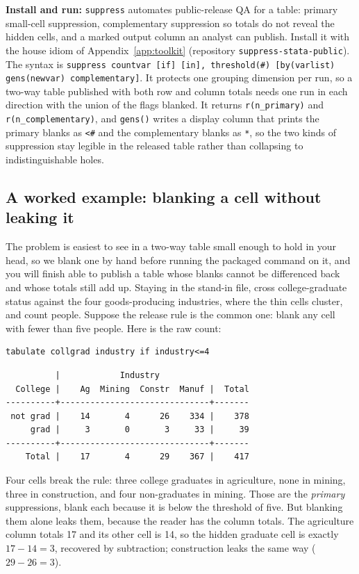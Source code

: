 \documentclass[
    a4paper,
    fontsize=10pt,
    twoside=true,
    numbers=noenddot,
]{kaobook}
\begin{document}
\begin{kaobox}[frametitle=Package Integration: \texttt{suppress}]
\textbf{Install and run:} \texttt{suppress} automates public-release QA for a table: primary small-cell suppression, complementary suppression so totals do not reveal the hidden cells, and a marked output column an analyst can publish. Install it with the house idiom of Appendix~\ref{app:toolkit} (repository \texttt{suppress-stata-public}).
The syntax is \texttt{suppress countvar [if] [in], threshold(\#) [by(varlist) gens(newvar) complementary]}. It protects one grouping dimension per run, so a two-way table published with both row and column totals needs one run in each direction with the union of the flags blanked. It returns \texttt{r(n\_primary)} and \texttt{r(n\_complementary)}, and \texttt{gens()} writes a display column that prints the primary blanks as \texttt{<\#} and the complementary blanks as \texttt{*}, so the two kinds of suppression stay legible in the released table rather than collapsing to indistinguishable holes.
\end{kaobox}

\subsection{A worked example: blanking a cell without leaking it}\label{sec:supexample}
The problem is easiest to see in a two-way table small enough to hold in your head, so we blank one by hand before running the packaged command on it, and you will finish able to publish a table whose blanks cannot be differenced back and whose totals still add up. Staying in the stand-in file, cross college-graduate status against the four goods-producing industries, where the thin cells cluster, and count people. Suppose the release rule is the common one: blank any cell with fewer than five people. Here is the raw count:
\par
{\footnotesize
\begin{verbatim}
tabulate collgrad industry if industry<=4
\end{verbatim}
}
\par
{\footnotesize
\begin{verbatim}
          |            Industry
  College |    Ag  Mining  Constr  Manuf |  Total
----------+------------------------------+-------
 not grad |    14       4      26    334 |    378
     grad |     3       0       3     33 |     39
----------+------------------------------+-------
    Total |    17       4      29    367 |    417
\end{verbatim}
}
Four cells break the rule: three college graduates in agriculture, none in mining, three in construction, and four non-graduates in mining. Those are the \emph{primary} suppressions, blank each because it is below the threshold of five. But blanking them alone leaks them, because the reader has the column totals. The agriculture column totals 17 and its other cell is 14, so the hidden graduate cell is exactly $17-14=3$, recovered by subtraction; construction leaks the same way ($29-26=3$). 
\end{document}
